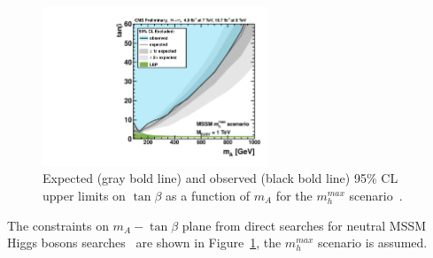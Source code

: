 \begin{figure}[p]
     \begin{center}
            \includegraphics[width=0.6\textwidth]{figure/limits/CSM.pdf}
    \end{center}

  \caption{
Expected (gray bold line) and observed (black bold line) 95\% CL upper limits
on $\tan\beta$ as a function of $m_A$ for the $m_h^{max}$ scenario~\cite{CMSLimit}.
}
  \label{fig:ex2}
\end{figure}



The constraints on $m_A - \tan\beta$  plane from direct searches for neutral MSSM Higgs bosons searches~\cite{CMSLimit}  are  shown in Figure~\ref{fig:ex2}, the 
$m_h^{max}$ scenario is assumed. 



 




















